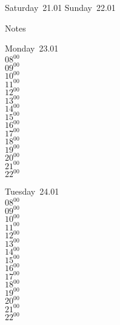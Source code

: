 \documentclass[11pt,a4paper]{book}\usepackage[]{graphicx}\usepackage[]{color}
\begin{document}
\begin{weekendbox}
  Saturday~21.01
  \tcblower
  Sunday~22.01
\end{weekendbox} %
\begin{notebox}
  Notes
\end{notebox}
\clearpage
\begin{headerbox}
\end{headerbox}
\begin{weekdaybox}
  Monday~23.01\\
  { 
  \vfill
  $08^{00}$\\
$09^{00}$\\
$10^{00}$\\
$11^{00}$\\
$12^{00}$\\
$13^{00}$\\
$14^{00}$\\
$15^{00}$\\
$16^{00}$\\
$17^{00}$\\
$18^{00}$\\
$19^{00}$\\
$20^{00}$\\
$21^{00}$\\
$22^{00}$\\
  }
\end{weekdaybox}
\begin{weekdaybox}
  Tuesday~24.01\\
  { 
  \vfill
  $08^{00}$\\
$09^{00}$\\
$10^{00}$\\
$11^{00}$\\
$12^{00}$\\
$13^{00}$\\
$14^{00}$\\
$15^{00}$\\
$16^{00}$\\
$17^{00}$\\
$18^{00}$\\
$19^{00}$\\
$20^{00}$\\
$21^{00}$\\
$22^{00}$\\
  }
\end{weekdaybox}
\end{document}
